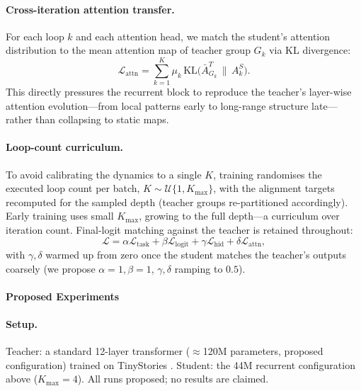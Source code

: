 \paragraph{Cross-iteration attention transfer.} For each loop $k$ and
each attention head, we match the student's attention distribution to
the mean attention map of teacher group $G_k$ via KL divergence:
\begin{equation}
\mathcal{L}_{\mathrm{attn}} = \sum_{k=1}^{K} \mu_k \,
\mathrm{KL}\big(\bar{A}^{T}_{G_k} \,\|\, A^{S}_{k}\big).
\end{equation}
This directly pressures the recurrent block to reproduce the
teacher's layer-wise attention evolution---from local patterns early
to long-range structure late---rather than collapsing to static maps.

\paragraph{Loop-count curriculum.} To avoid calibrating the dynamics to
a single $K$, training randomises the executed loop count per batch,
$K \sim \mathcal{U}\{1, K_{\max}\}$, with the alignment targets
recomputed for the sampled depth (teacher groups re-partitioned
accordingly). Early training uses small $K_{\max}$, growing to the
full depth---a curriculum over iteration count. Final-logit matching
against the teacher is retained throughout:
\begin{equation}
\mathcal{L} = \alpha \mathcal{L}_{\mathrm{task}}
+ \beta \mathcal{L}_{\mathrm{logit}}
+ \gamma \mathcal{L}_{\mathrm{hid}}
+ \delta \mathcal{L}_{\mathrm{attn}},
\end{equation}
with $\gamma, \delta$ warmed up from zero once the student matches the
teacher's outputs coarsely (we propose $\alpha{=}1, \beta{=}1$,
$\gamma, \delta$ ramping to $0.5$).

\paragraph{Proposed Experiments}
\label{sec:experiments}

\paragraph{Setup.} Teacher: a standard 12-layer transformer
($\approx$120M parameters, proposed configuration) trained on
TinyStories \citep{eldan2023tinystories}. Student: the 44M recurrent
configuration above ($K_{\max}{=}4$). All runs proposed; no results
are claimed.

